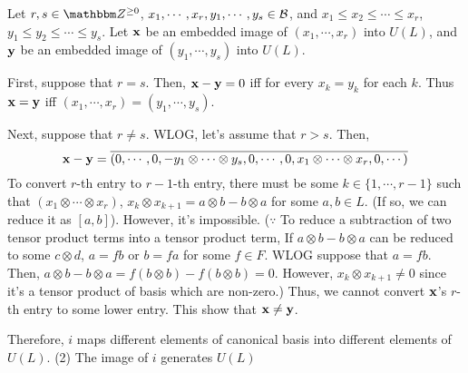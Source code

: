 Let \(r, s \in \bbZ^{\ge 0}\),
\(x_1, \cdots, x_r, y_1, \cdots, y_s \in \mathcal{B}\),
and \(x_1 \le x_2 \le \cdots \le x_r\),
\(y_1 \le y_2 \le \cdots \le y_s\).
Let \(\mathbf{x}\) be an embedded image of \((x_1, \cdots, x_r)\) into \(U(L)\),
and \(\mathbf{y}\) be an embedded image of \((y_1, \cdots, y_s)\) into \(U(L)\).

First, suppose that \(r = s\).
Then, \(\mathbf{x} - \mathbf{y} = 0\) iff for every \(x_k = y_k\) for each \(k\).
Thus \(\mathbf{x} = \mathbf{y}\) iff \((x_1, \cdots, x_r) = (y_1, \cdots, y_s)\).

Next, suppose that \(r \neq s\).
WLOG, let's assume that \(r > s\).
Then,
\[\mathbf{x} - \mathbf{y}
= \overline{(0, \cdots, 0, -y_1 \otimes \cdots \otimes y_s, 0, \cdots, 0, x_1 \otimes \cdots \otimes x_r, 0, \cdots)}\]
To convert \(r\)-th entry to \(r-1\)-th entry,
there must be some \(k \in \{1, \cdots, r - 1\}\) such that
\((x_1 \otimes \cdots \otimes x_r)\),
\(x_k \otimes x_{k + 1} = a \otimes b - b \otimes a\)
for some \(a, b \in L\). (If so, we can reduce it as \([a, b]\)).
However, it's impossible.
(\(\because\)
 To reduce a subtraction of two tensor product terms into a tensor product term,
 If \(a \otimes b - b \otimes a\) can be reduced to some \(c \otimes d\),
 \(a = fb\) or \(b = fa\) for some \(f \in F\).
 WLOG suppose that \(a = fb\). Then,
 \(a \otimes b - b \otimes a = f(b \otimes b) - f (b \otimes b) = 0\).
 However, \(x_k \otimes x_{k + 1} \neq 0\) since it's a tensor product of
 basis which are non-zero.)
Thus, we cannot convert \(\mathbf{x}\)'s \(r\)-th entry to some lower entry.
This show that \(\mathbf{x} \neq \mathbf{y}\).

Therefore, \(i\) maps different elements of canonical basis into different elements of \(U(L)\).
\br
\noindent
(2) The image of \(i\) generates \(U(L)\)

